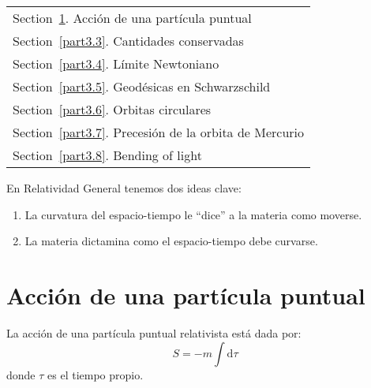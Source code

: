 \documentclass[../main]{subfiles}
\begin{document}
        \begin{margintable}\vspace{1.3in}\footnotesize
		\begin{tabularx}{\marginparwidth}{|X}
            Section~\ref{part3.2}. Acción de una partícula puntual \\
            Section~\ref{part3.3}. Cantidades conservadas\\
            Section~\ref{part3.4}. Límite Newtoniano\\
            Section~\ref{part3.5}. Geodésicas en Schwarzschild\\
            Section~\ref{part3.6}. Orbitas circulares\\
            Section~\ref{part3.7}. Precesión de la orbita de Mercurio\\
            Section~\ref{part3.8}. Bending of light\\
		\end{tabularx}
	\end{margintable}

En Relatividad General tenemos dos ideas clave: 
\begin{enumerate}
    \item La curvatura del espacio-tiempo le ``dice'' a la materia como moverse.
    \item La materia dictamina como el espacio-tiempo debe curvarse.
\end{enumerate}

\section{Acción de una partícula puntual}\label{part3.2}

La acción de una partícula puntual relativista está dada por:
\begin{equation}
    S=-m \int \mathrm{d}\tau
\end{equation}
donde $\tau$ es el tiempo propio. 
\end{document}
